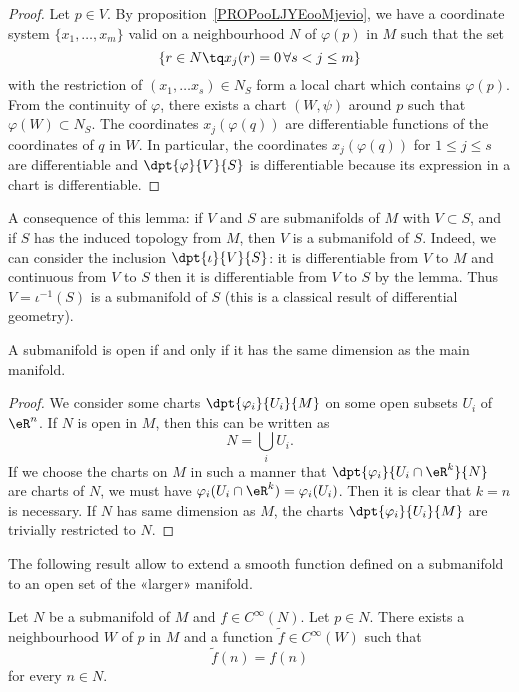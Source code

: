 \begin{proof}
Let $p\in V$. By proposition~\ref{PROPooLJYEooMjevio}, we have  a coordinate system $\{x_1,\ldots,x_m\}$ valid on a neighbourhood $N$ of $\varphi(p)$ in $M$ such that the set
\[
  \{r\in N\tq x_j(r)=0\, \forall s<j\leq m  \}
\]
with the restriction of $(x_1,\ldots x_s)\in N_S$ form a local chart which contains $\varphi(p)$. From the continuity of $\varphi$, there exists a chart $(W,\psi)$ around $p$ such that $\varphi(W)\subset N_S$. The coordinates $x_j(\varphi(q))$ are differentiable functions of  the coordinates of $q$ in $W$. In particular, the coordinates $x_j(\varphi(q))$ for $1\leq j\leq s$ are differentiable and $\dpt{\varphi}{V}{S}$ is differentiable because its expression in a chart is differentiable.
\end{proof}

A consequence of this lemma: if $V$ and $S$ are submanifolds of $M$ with $V\subset S$, and if $S$ has the induced topology from $M$, then $V$ is a submanifold of $S$. Indeed, we can consider the inclusion $\dpt{\iota}{V}{S}$: it is differentiable from $V$ to $M$ and continuous from $V$ to $S$ then it is differentiable from $V$ to $S$ by the lemma. Thus $V=\iota^{-1}(S)$ is a submanifold of $S$ (this is a classical result of differential geometry).

\begin{proposition}
A submanifold is open if and only if it has the same dimension as the main manifold.
\label{prop:subvar_ouvert}
\end{proposition}

\begin{proof}
We consider some charts $\dpt{\varphi_i}{U_i}{M}$ on some open subsets $U_i$ of $\eR^n$. If $N$ is open in $M$, then this can be written as
\[
  N=\bigcup_iU_i.
\]
If we choose the charts on $M$ in such a manner that $\dpt{\varphi_i}{U_i\cap \eR^k}{N}$ are charts of $N$, we must have $\varphi_i(U_i\cap\eR^k)=\varphi_i(U_i)$. Then it is clear that $k=n$ is necessary.
If $N$ has same dimension as $M$, the charts $\dpt{\varphi_i}{U_i}{M}$ are trivially restricted to $N$.
\end{proof}

The following result allow to extend a smooth function defined on a submanifold to an open set of the «larger» manifold. 
\begin{proposition}     \label{PROPooOTZQooIfboXV}
    Let \( N\) be a submanifold of \( M\) and \( f\in  C^{\infty}(N)\). Let \( p\in N\). There exists a neighbourhood \( W\) of \( p\) in \( M\) and a function \( \tilde f\in  C^{\infty}(W)\) such that
    \begin{equation}
        \tilde f(n)=f(n)
    \end{equation}
    for every \( n\in N\).
\end{proposition}

